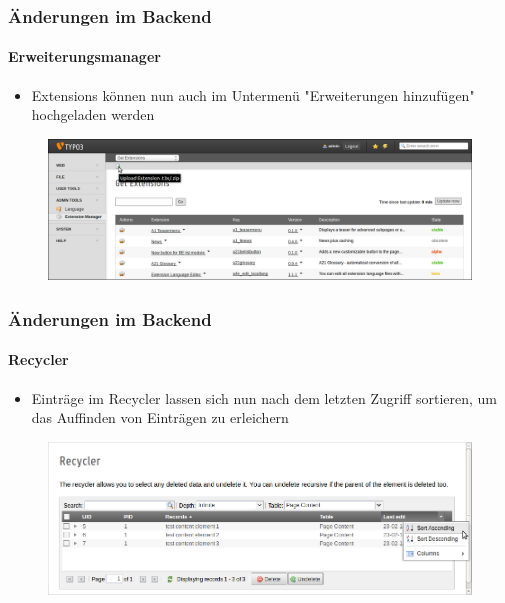 
\begin{frame}[fragile]
	\frametitle{Änderungen im Backend}
	\framesubtitle{Erweiterungsmanager}

 	\begin{itemize}
		\item Extensions können nun auch im Untermenü "Erweiterungen hinzufügen" hochgeladen werden
	\end{itemize}

	\begin{figure}
		\includegraphics[width=0.95\linewidth]{Images/BackendChanges/UploadExtension.png}
	\end{figure}

\end{frame}


\begin{frame}[fragile]
	\frametitle{Änderungen im Backend}
	\framesubtitle{Recycler}

 	\begin{itemize}
		\item Einträge im Recycler lassen sich nun nach dem letzten Zugriff sortieren, um das Auffinden von Einträgen zu erleichern
	\end{itemize}

	\begin{figure}
		\includegraphics[width=0.95\linewidth]{Images/BackendChanges/RecyclerSortRecord.png}
	\end{figure}

\end{frame}

